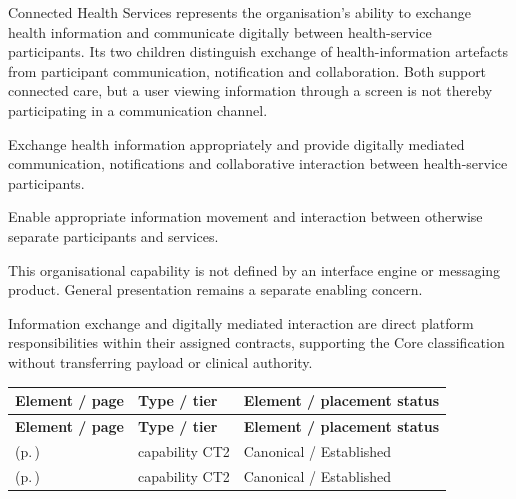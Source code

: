 Connected Health Services represents the organisation's ability to exchange health information and communicate digitally between health-service participants. Its two children distinguish exchange of health-information artefacts from participant communication, notification and collaboration. Both support connected care, but a user viewing information through a screen is not thereby participating in a communication channel.



Exchange health information appropriately and provide digitally mediated communication, notifications and collaborative interaction between health-service participants.



Enable appropriate information movement and interaction between otherwise separate participants and services.



This organisational capability is not defined by an interface engine or messaging product. General presentation remains a separate enabling concern.



Information exchange and digitally mediated interaction are direct platform responsibilities within their assigned contracts, supporting the Core classification without transferring payload or clinical authority.


\begingroup\small\setlength{\TableWidth}{\dimexpr\linewidth-6\tabcolsep-4\arrayrulewidth\relax}
\begin{longtable}{|>{\raggedright\arraybackslash}p{0.52\TableWidth}|>{\raggedright\arraybackslash}p{0.2\TableWidth}|>{\raggedright\arraybackslash}p{0.28\TableWidth}|}
\hline\rowcolor{TableHead}\textbf{Element / page} & \textbf{Type / tier} & \textbf{Element / placement status}\\\hline\endfirsthead
\hline\rowcolor{TableHead}\textbf{Element / page} & \textbf{Type / tier} & \textbf{Element / placement status}\\\hline\endhead
\hline\endfoot
\nameref{cap:bc-health-information-exchange} (p.\,\pageref{cap:bc-health-information-exchange}) & capability CT2 & Canonical / Established\\\hline
\nameref{cap:bc-digital-communication-channel} (p.\,\pageref{cap:bc-digital-communication-channel}) & capability CT2 & Canonical / Established\\\hline
\end{longtable}\endgroup


